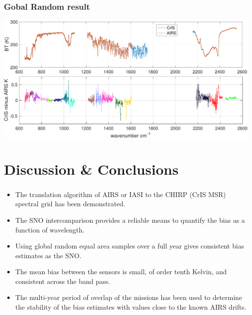 \documentclass[10pt,t]{beamer}
\begin{document}
\begin{frame}
  \frametitle{Gobal Random result}
  \begin{center}
    \includegraphics[width=\linewidth]{./Figs/Pdf/ac_global_random_fs_bias_mean.pdf}
  \end{center}

\end{frame}

\section{Discussion \& Conclusions}
\begin{frame}
  \frametitle{}
  \begin{itemize}
  \item The translation algorithm of AIRS or IASI to the CHIRP (CrIS MSR) spectral grid has been demonstrated.
  \item The SNO intercomparison provides a reliable means to quantify the bias as a function of wavelength.
    \item Using global random equal area samples over a full year gives consistent bias estimates as the SNO.
    \item The mean bias between the sensors is small, of order tenth Kelvin, and consistent across the band pass.
    \item The multi-year period of overlap of the missions has been used to determine the stability of the bias estimates with values close to the known AIRS drifts.
    
  \end{itemize}

\end{frame}

\end{document}
